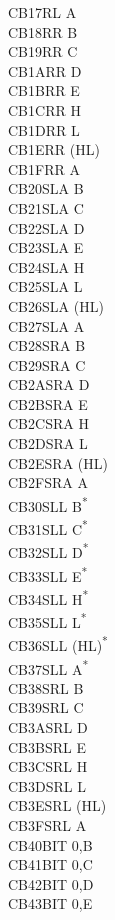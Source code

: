 \documentclass[twoside,openright,a4paper]{book}
\begin{document}
\begin{multicols}{3}
{\begin{tabbing}
	CB17\>RL A\\
	CB18\>RR B\\
	CB19\>RR C\\
	CB1A\>RR D\\
	CB1B\>RR E\\
	CB1C\>RR H\\
	CB1D\>RR L\\
	CB1E\>RR (HL)\\
	CB1F\>RR A\\
	CB20\>SLA B\\
	CB21\>SLA C\\
	CB22\>SLA D\\
	CB23\>SLA E\\
	CB24\>SLA H\\
	CB25\>SLA L\\
	CB26\>SLA (HL)\\
	CB27\>SLA A\\
	CB28\>SRA B\\
	CB29\>SRA C\\
	CB2A\>SRA D\\
	CB2B\>SRA E\\
	CB2C\>SRA H\\
	CB2D\>SRA L\\
	CB2E\>SRA (HL)\\
	CB2F\>SRA A\\
	CB30\>SLL B\textsuperscript{*}\\
	CB31\>SLL C\textsuperscript{*}\\
	CB32\>SLL D\textsuperscript{*}\\
	CB33\>SLL E\textsuperscript{*}\\
	CB34\>SLL H\textsuperscript{*}\\
	CB35\>SLL L\textsuperscript{*}\\
	CB36\>SLL (HL)\textsuperscript{*}\\
	CB37\>SLL A\textsuperscript{*}\\
	CB38\>SRL B\\
	CB39\>SRL C\\
	CB3A\>SRL D\\
	CB3B\>SRL E\\
	CB3C\>SRL H\\
	CB3D\>SRL L\\
	CB3E\>SRL (HL)\\
	CB3F\>SRL A\\
	CB40\>BIT 0,B\\
	CB41\>BIT 0,C\\
	CB42\>BIT 0,D\\
	CB43\>BIT 0,E\\

\end{tabbing}}
\end{multicols}
\end{document}
